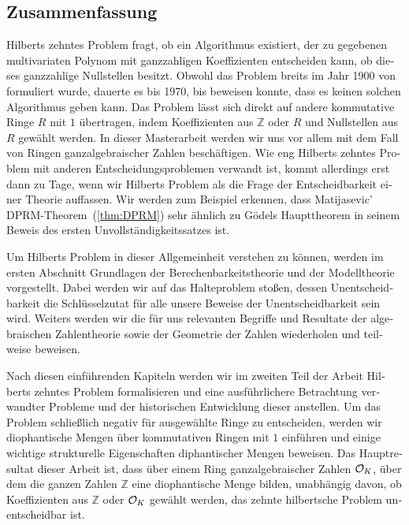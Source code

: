 

\begin{german}
\section{Zusammenfassung}

Hilberts zehntes Problem fragt, ob ein Algorithmus existiert, der zu gegebenen
multivariaten Polynom mit ganzzahligen Koeffizienten entscheiden kann, ob
dieses ganzzahlige Nullstellen besitzt. Obwohl das Problem breits im Jahr 1900
von \textcite{Hilbert1900} formuliert wurde, dauerte es bis 1970, bis
\textcite{Matijasevic1970} beweisen konnte, dass es keinen solchen Algorithmus
geben kann. Das Problem lässt sich direkt auf andere kommutative Ringe \(R\) mit
\(1\) übertragen, indem Koeffizienten aus \(ℤ\) oder \(R\) und Nullstellen aus
\(R\) gewählt werden. In dieser Masterarbeit werden wir uns vor allem mit dem
Fall von Ringen ganzalgebraischer Zahlen beschäftigen. Wie eng Hilberts zehntes
Problem mit anderen Entscheidungsproblemen verwandt ist, kommt allerdings erst
dann zu Tage, wenn wir Hilberts Problem als die Frage der Entscheidbarkeit einer
Theorie auffassen. Wir werden zum Beispiel erkennen, dass Matijasevic'
\textsc{DPRM}-Theorem~(\ref{thm:DPRM}) sehr ähnlich zu Gödels Haupttheorem in
seinem Beweis \cite{Goedel1931} des ersten Unvollständigkeitssatzes ist.

Um Hilberts Problem in dieser Allgemeinheit verstehen zu können, werden im
ersten Abschnitt Grundlagen der Berechenbarkeitstheorie und der Modelltheorie
vorgestellt. Dabei werden wir auf das Halteproblem stoßen, dessen
Unentscheidbarkeit die Schlüsselzutat für alle unsere Beweise der
Unentscheidbarkeit sein wird. Weiters werden wir die für uns relevanten Begriffe
und Resultate der algebraischen Zahlentheorie sowie der Geometrie der Zahlen
wiederholen und teilweise beweisen.

Nach diesen einführenden Kapiteln werden wir im zweiten Teil der Arbeit Hilberts
zehntes Problem formalisieren und eine ausführlichere Betrachtung verwandter
Probleme und der historischen Entwicklung dieser anstellen. Um das Problem
schließlich negativ für ausgewählte Ringe zu entscheiden, werden wir
diophantische Mengen über kommutativen Ringen mit \(1\) einführen und
einige wichtige strukturelle Eigenschaften diphantischer Mengen beweisen. Das
Hauptresultat dieser Arbeit ist, dass über einem Ring ganzalgebraischer
Zahlen \(\mathcal{O}_{K}\), über dem die ganzen Zahlen \(ℤ\) eine diophantische Menge
bilden, unabhängig davon, ob Koeffizienten aus \(ℤ\) oder \(\mathcal{O}_{K}\) gewählt
werden, das zehnte hilbertsche Problem unentscheidbar ist.


\end{german}
